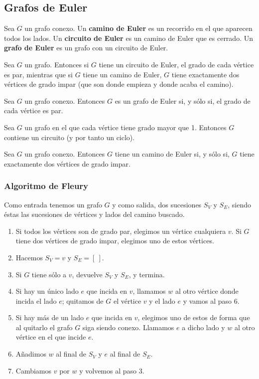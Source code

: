 \subsection{Grafos de Euler}
\begin{ndef}
    Sea $G$ un grafo conexo. Un \textbf{camino de Euler} es un recorrido en el que aparecen todos los lados. Un \textbf{circuito de Euler} es un camino de Euler que es cerrado. Un \textbf{grafo de Euler} es un grafo con un circuito de Euler.
\end{ndef}

\begin{nprop}
    Sea $G$ un grafo. Entonces si $G$ tiene un circuito de Euler, el grado de cada vértice es par, mientras que si $G$ tiene un camino de Euler, $G$ tiene exactamente dos vértices de grado impar (que son donde empieza y donde acaba el camino).
\end{nprop}

\begin{nth}
    Sea $G$ un grafo conexo. Entonces $G$ es un grafo de Euler si, y sólo si, el grado de cada vértice es par.
\end{nth}

\begin{lema}
    Sea $G$ un grafo en el que cada vértice tiene grado mayor que 1. Entonces $G$ contiene un circuito (y por tanto un ciclo).
\end{lema}

\begin{ncor}
    Sea $G$ un grafo conexo. Entonces $G$ tiene un camino de Euler si, y sólo si, $G$ tiene exactamente dos vértices de grado impar.
\end{ncor}

\subsubsection{Algoritmo de Fleury}
Como entrada tenemos un grafo $G$ y como salida, dos sucesiones $S_V$ y $S_E$, siendo éstas las sucesiones de vértices y lados del camino buscado.
\begin{enumerate}
    \item Si todos los vértices son de grado par, elegimos un vértice cualquiera $v$. Si $G$ tiene dos vértices de grado impar, elegimos uno de estos vértices.
    \item Hacemos $S_V = v$ y $S_E = [\ ]$.
    \item Si $G$ tiene sólo a $v$, devuelve $S_V$ y $S_E$, y termina.
    \item Si hay un único lado $e$ que incida en $v$, llamamos $w$ al otro vértice donde incida el lado $e$; quitamos de $G$ el vértice $v$ y el lado $e$ y vamos al paso 6.
    \item Si hay más de un lado $e$ que incida en $v$, elegimos uno de estos de forma que al quitarlo el grafo $G$ siga siendo conexo. Llamamos $e$ a dicho lado y $w$ al otro vértice en el que incide $e$.
    \item Añadimos $w$ al final de $S_V$ y $e$ al final de $S_E$.
    \item Cambiamos $v$ por $w$ y volvemos al paso 3.
\end{enumerate}

